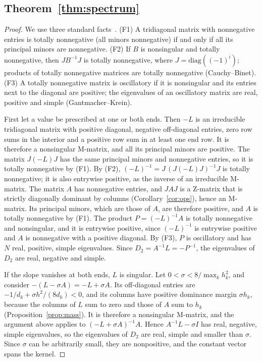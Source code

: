 \documentclass[preprint,12pt]{elsarticle}
\theoremstyle{remark}
\begin{document}
\subsection{Theorem~\ref{thm:spectrum}}\label{app:spectrum}
\begin{proof}
We use three standard facts~\cite{gantmacher2002oscillation,fallat2011totally}. (F1) A tridiagonal matrix
with nonnegative entries is totally nonnegative (all minors nonnegative) if and only if all its principal
minors are nonnegative. (F2) If $B$ is nonsingular and totally nonnegative, then $JB^{-1}J$ is totally
nonnegative, where $J=\mathrm{diag}((-1)^i)$; products of totally nonnegative matrices are totally
nonnegative (Cauchy--Binet). (F3) A totally nonnegative matrix is oscillatory if it is nonsingular and its
entries next to the diagonal are positive; the eigenvalues of an oscillatory matrix are real, positive and
simple (Gantmacher--Krein).

First let a value be prescribed at one or both ends. Then $-L$ is an irreducible tridiagonal matrix with
positive diagonal, negative off-diagonal entries, zero row sums in the interior and a positive row sum
in at least one end row. It is therefore a nonsingular M-matrix, and all its principal minors are positive.
The matrix $J(-L)J$ has the same principal minors and nonnegative entries, so it is totally nonnegative by
(F1). By (F2), $(-L)^{-1}=J\,(J(-L)J)^{-1}J$ is totally nonnegative; it is also entrywise positive, as the
inverse of an irreducible M-matrix. The matrix $A$ has nonnegative entries, and $JAJ$ is a Z-matrix that is
strictly diagonally dominant by columns (Corollary~\ref{cor:ops}), hence an M-matrix. Its principal minors,
which are those of $A$, are therefore positive, and $A$ is totally nonnegative by (F1). The product
$P=(-L)^{-1}A$ is totally nonnegative and nonsingular, and it is entrywise positive, since $(-L)^{-1}$ is
entrywise positive and $A$ is nonnegative with a positive diagonal. By (F3), $P$ is oscillatory and has $N$
real, positive, simple eigenvalues. Since $D_2=A^{-1}L=-P^{-1}$, the eigenvalues of $D_2$ are real,
negative and simple.

If the slope vanishes at both ends, $L$ is singular. Let
$0<\sigma<8/\max_kh_k^2$, and consider $-(L-\sigma A)=-L+\sigma A$. Its off-diagonal entries are
$-1/d_k+\sigma h^2/(8d_k)<0$, and its columns have positive dominance margin $\sigma h_k$, because the columns
of $L$ sum to zero and those of $A$ sum to $h_k$ (Proposition~\ref{prop:mass}). It is therefore a nonsingular
M-matrix, and the argument above applies to $(-L+\sigma A)^{-1}A$. Hence $A^{-1}L-\sigma I$ has real,
negative, simple eigenvalues, so the eigenvalues of $D_2$ are real, simple and smaller than $\sigma$. Since
$\sigma$ can be arbitrarily small, they are nonpositive, and the constant vector spans the kernel.
\end{proof}
\end{document}
